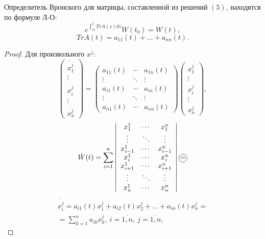 \begin{theorem}
	Определитель Вронского для матрицы, составленной из решений $(5)$, находятся по формуле Л-О:
	\[
		e^{\int_{t_0}^{t} TrA(s)ds } W(t_0) = W(t),
	\]
	\[
		TrA(t) = a_{11} (t) + \ldots + a_{nn} (t).
	\]
\end{theorem}

\begin{proof}
	Для произвольного $x^j$:
	\[
		\left(\begin{array}{c}
				\dot{x_{1}^{j} } \\ \vdots \\ \dot{x_{i}^{j} } \\ \vdots \\ \dot{x_{n}^{j} }
			\end{array}\right) = \left(\begin{array}{ccc}
				a_{11} (t) & \cdots & a_{1n} (t) \\
				\vdots     & \ddots & \vdots     \\
				a_{i1} (t) & \cdots & a_{in} (t) \\
				\vdots     & \ddots & \vdots     \\
				a_{n1} (t) & \cdots & a_{nn} (t)
			\end{array}\right) \left(\begin{array}{c}
				x_{1}^{j} \\ \vdots \\ x_{i}^{j} \\ \vdots \\ x_{n}^{j}
			\end{array}\right),
	\]
	\[
		\dot{W}(t) = \sum_{i=1}^{n} \left|\begin{array}{ccc}
			x_{1}^{1}   & \cdots & x_{1}^{n}   \\
			\vdots      & \ddots & \vdots      \\
			x_{i-1}^{1} & \cdots & x_{i-1}^{n} \\
			x_{i}^{1}   & \cdots & x_{i}^{n}   \\
			x_{i+1}^{1} & \cdots & x_{i+1}^{n} \\
			\vdots      & \ddots & \vdots      \\
			x_{n}^{1}   & \cdots & x_{n}^{n}
		\end{array}\right| \circled{=}
	\]
	\begin{multline*}
		\dot{x_{i}^{j} } = a_{i1}(t) x_{1}^{j} + a_{i2} (t)x_{2}^{j} + \ldots + a_{in} (t)x_{n}^{j} = \\
		= \sum_{k=1}^{n} a_{ik} x_{k}^{j}, \ i = \overline{1,n} , \ j = \overline{1,n},

\end{multline*}
\end{proof}
